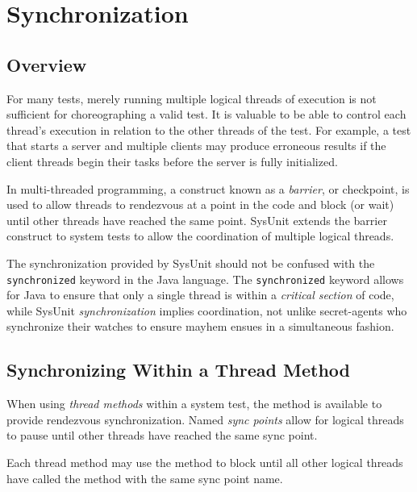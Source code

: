 \chapter{Synchronization}

\section{Overview}

For many tests, merely running multiple logical threads
of execution is not sufficient for choreographing a valid
test.  It is valuable to be able to control each thread's
execution in relation to the other threads of the test.
For example, a test that starts a server and multiple clients
may produce erroneous results if the client threads begin their
tasks before the server is fully initialized.

In multi-threaded programming, a construct known as a 
\emph{barrier}, or checkpoint, 
is used to allow threads
to rendezvous at a point in the code and block (or wait)
until other threads have reached the same point.  SysUnit
extends the barrier construct to system tests to allow the
coordination of multiple logical threads.

\begin{note}
The synchronization provided by SysUnit should not be
confused with the \texttt{synchronized} keyword in the
Java language.  The \texttt{synchronized} keyword allows
for Java to ensure that only a single thread is within 
a \emph{critical section}
of code, while SysUnit \emph{synchronization} implies
coordination, not unlike secret-agents who synchronize their
watches to ensure mayhem ensues in a simultaneous fashion.
\end{note}

\section{Synchronizing Within a Thread Method}

When using \emph{thread methods} within a system
test, the  method
is available to provide rendezvous synchronization.  Named
\emph{sync points} allow for logical
threads to pause until other threads have reached the same
sync point.

Each thread method may use the 
method to block until all other logical threads have called the
method with the same sync point name.

